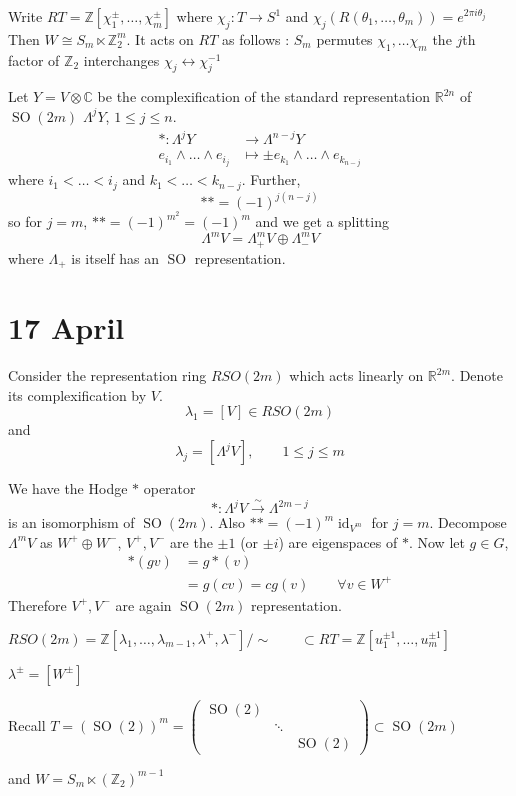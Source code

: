 \documentclass[11pt,a4paper]{scrarticle}
\theoremstyle{definition}
\renewenvironment{proof}[1][\proofname]{\vspace{-10pt}\begin{myproof}}{\end{myproof}}
\theoremstyle{greenbox}
\newcommand{\R}{\mathbb{R}}
\newcommand{\Z}{\mathbb{Z}}
\newcommand{\C}{\mathbb{C}}
\begin{document}
\begin{example}
     Write $ RT = \Z[\chi_{1}^{\pm}, \dots, \chi_{m}^{\pm}] $ where $ \chi_{j}: T \to S^{1} $ and $ \chi_{j}(R(\theta_{1}, \dots, \theta_{m})) = e^{2 \pi i \theta_{j}} $
     Then $ W \cong S_{m} \ltimes \Z_{2}^{m} $. It acts on $ RT $ as follows : $ S_{m}$  permutes $ \chi_{1}, \dots \chi_{m} $ the $ j $th factor of $ \Z_{2} $ interchanges $ \chi_{j} \longleftrightarrow \chi_{j}^{-1} $
\end{example}
Let $ Y = V \otimes \C $ be the complexification of the standard representation $ \R^{2n} $ of $ \operatorname{SO}(2m) $ $ \Lambda^{j} Y $, $ 1 \le j \le n $. \begin{align*}
    * : \Lambda^{j} Y & \to \Lambda^{n-j}Y \\
    e_{i_{1}} \wedge \dots \wedge e_{i_{j}} & \mapsto \pm e_{k_{1}} \wedge \dots \wedge e_{k_{n-j}}
\end{align*}
where $ i_{1}< \dots < i_{j} $ and $ k_{1} < \dots < k_{n-j} $. Further, 
\[ ** = (-1)^{j(n-j)} \]
so for $ j=m $, $ ** = (-1)^{m^{2}} = (-1)^{m} $ and we get a splitting 
\[ \Lambda^{m}V = \Lambda_{+}^{m}V \oplus \Lambda_{-}^{m}V \]
where $ \Lambda_{+} $ is itself has an $ \operatorname{SO} $ representation. 

\section{17 April}

Consider the representation ring $ RSO(2m) $ which acts linearly on $ \R^{2m} $. Denote its complexification by $ V $. 
\[ \lambda_{1} = [V] \in RSO(2m) \]
and 
\[ \lambda_{j} = [\Lambda^{j}V] , \qquad 1 \le j \le m \]

We have the Hodge $ * $ operator 
\[ * : \Lambda^{j} V \xrightarrow{\sim} \Lambda^{2m-j} \]
is an isomorphism of $ \operatorname{SO}(2m) $. Also $ ** = (-1)^{m} \operatorname{id}_{V^{m}} $ for $ j = m $. Decompose $ \Lambda^{m} V  $ as $ W^{+} \oplus W^{-} $, $ V^{+}, V^{-} $ are the $ \pm 1$ (or $ \pm i $) are eigenspaces of $ * $. Now let $ g \in G $, \begin{align*}
    *(gv) & = g * (v) \\
    & = g(cv) = c g(v) \qquad \forall v \in W^{+}
\end{align*}
Therefore $ V^{+}, V^{-} $ are again $ \operatorname{SO}(2m) $ representation. 

\begin{thm}
    $ RSO(2m) = \Z[ \lambda_{1}, \dots, \lambda_{m-1}, \lambda^{+}, \lambda^{-}] / \sim   \qquad \subset RT = \Z[u_{1}^{\pm 1}, \dots, u_{m}^{\pm 1}]$

    $ \lambda^{\pm} = [W^{\pm}] $
\end{thm}
\begin{proof}
    Recall $ T = (\operatorname{SO}(2))^{m} = \begin{pmatrix}
        \operatorname{SO}(2) &  & \\
        & \ddots & \\
        & & \operatorname{SO}(2)
    \end{pmatrix} \subset \operatorname{SO}(2m) $

    and $ W = S_{m} \ltimes (\Z_{2})^{m-1} $
\end{proof}
\end{document}
